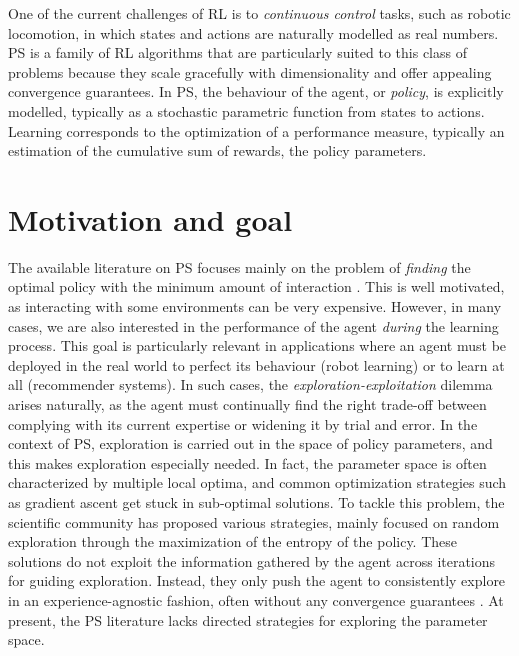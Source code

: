 One of the current challenges of \gls{RL} is to \emph{continuous control}  tasks, such as robotic locomotion, in which states and actions are naturally modelled as real numbers. \gls{PS} \cite{deisenroth2013survey} is a family of \gls{RL} algorithms that are particularly suited to this class of problems because they scale gracefully with dimensionality and offer appealing convergence guarantees. In \gls{PS}, the behaviour of the agent, or \textit{policy}, is explicitly modelled, typically as a stochastic parametric function from states to actions. Learning corresponds to the optimization of a performance measure, typically an estimation of the cumulative sum of rewards, \wrt the policy parameters. 

\section{Motivation and goal}

The available literature on \gls{PS} focuses mainly on the problem of \textit{finding} the optimal policy with the minimum amount of interaction \cite{sutton2000policy, sehnke2008policy, silver2014deterministic, schulman2015trust, mnih2016asynchronous, espeholt2018impala}. This is well motivated, as interacting with some environments can be very expensive. However, in many cases, we are also interested in the performance of the agent \textit{during} the learning process. This goal is particularly relevant in applications where an agent must be deployed in the real world to perfect its behaviour (\eg robot learning) or to learn at all (\eg recommender systems). In such cases, the \textit{exploration-exploitation} dilemma arises naturally, as the agent must continually find the right trade-off between complying with its current expertise or widening it by trial and error. In the context of \gls{PS}, exploration is carried out in the space of policy parameters, and this makes exploration especially needed. In fact, the parameter space is often characterized by multiple local optima, and common optimization strategies such as gradient ascent get stuck in sub-optimal solutions. To tackle this problem, the scientific community has proposed various strategies, mainly focused on random exploration through the maximization of the entropy of the policy. These solutions do not exploit the information gathered by the agent across iterations for guiding exploration. Instead, they only push the agent to consistently explore in an experience-agnostic fashion, often without any convergence guarantees \cite{ziebart2008maximum, haarnoja2017reinforcement, haarnoja2018soft}. At present, the \gls{PS} literature lacks directed strategies for exploring the parameter space.

